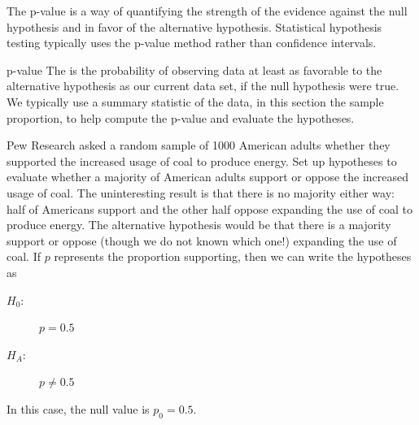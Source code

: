 \label{pValue}



The p-value is a way of quantifying the strength of the
evidence against the null hypothesis and in favor of the
alternative hypothesis.
Statistical hypothesis testing typically uses the
p-value method rather than confidence intervals.

\begin{onebox}{p-value}
  The 
  is the probability of observing data at least as favorable
  to the alternative hypothesis as our current data set,
  if the null hypothesis were true. We typically use a summary
  statistic of the data, in this section the sample proportion,
  to help compute the p-value and evaluate the hypotheses.
\end{onebox}



\newcommand{\pewcoalpollsize}{1000}
\newcommand{\pewcoalpollprop}{0.37}
\newcommand{\pewcoalpollpropcomplement}{0.63}
\newcommand{\pewcoalpollpercent}{37\%}
\newcommand{\pewcoalpollpercentcomplement}{63\%}
\newcommand{\pewcoalpollcount}{370}
\newcommand{\pewcoalpollcountcomplement}{630}
\newcommand{\pewcoalpollse}{0.0153}
\newcommand{\pewcoalpollnullvalue}{0.5}
\newcommand{\pewcoalpollnullse}{0.016}

\begin{examplewrap}
\begin{nexample}{Pew Research asked a random sample of
    \pewcoalpollsize{} American
    adults whether they supported the increased usage of coal to
    produce energy.
    Set up hypotheses to evaluate whether
    a majority of American adults support or oppose
    the increased usage of coal.}
  The uninteresting result is that there is no majority either way:
  half of Americans support and the other half oppose expanding the
  use of coal to produce energy. The alternative hypothesis would
  be that there is a majority support or oppose
  (though we do not known which one!) expanding the
  use of coal. If $p$ represents the proportion supporting, then
  we can write the hypotheses as
  \begin{description}
    \item[$H_0$:] $p = 0.5$
    \item[$H_A$:] $p \neq 0.5$
  \end{description}
  In this case, the null value is $p_0 = 0.5$.
\end{nexample}
\end{examplewrap}

